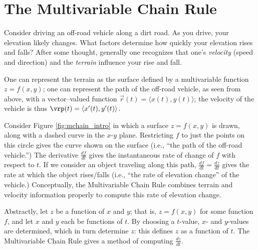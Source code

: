 \section{The Multivariable Chain Rule}\label{sec:multi_chain}
Consider driving an off-road vehicle along a dirt road. As you drive, your elevation likely changes. What factors determine how quickly your elevation rises and falls? 
After some thought, generally one recognizes that one's \emph{velocity} (speed and direction) and the \emph{terrain} influence your rise and fall. 

One can represent the terrain as the surface defined by a multivariable function $z=f(x,y)$; one can represent the path of the off-road vehicle, as seen from above, with a vector--valued function $\vec r(t) = \langle x(t), y(t)\rangle$; the velocity of the vehicle is thus $\vrp(t) = \langle x'(t),y'(t)\rangle$.

Consider Figure \ref{fig:mchain_intro} in which a surface $z=f(x,y)$ is drawn, along with a dashed curve in the $x$-$y$ plane. Restricting $f$ to just the points on this circle gives the curve shown on the surface (i.e., ``the path of the off-road vehicle.'') The derivative $\frac{df}{dt}$ gives the instantaneous rate of change of $f$ with respect to $t$. If we consider an object traveling along this path, $\frac{df}{dt}=\frac{dz}{dt}$ gives the rate at which the object rises/falls (i.e., ``the rate of elevation change'' of the vehicle.) Conceptually, the Multivariable Chain Rule combines terrain and velocity information properly to compute this rate of elevation change. 




Abstractly, let $z$ be a function of $x$ and $y$; that is, $z=f(x,y)$ for some function $f$, and let $x$ and $y$ each be functions of $t$. By choosing a $t$-value, $x$- and $y$-values are determined, which in turn determine $z$: this defines $z$ as a function of $t$. The Multivariable Chain Rule gives a method of computing $ \frac{dz}{dt}$.



